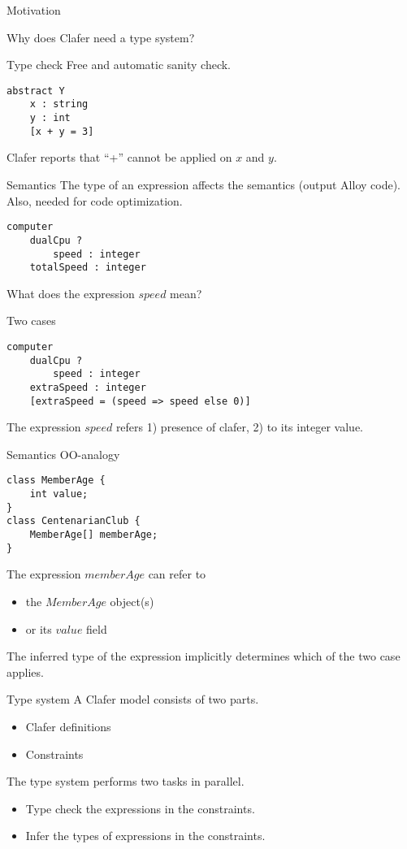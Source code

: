 \documentclass[table,15pt,t]{beamer}
\newcommand{\vmiddle}[1]{
  \vspace{\stretch{1}}
  #1
  \vspace{\stretch{1}}
}
\begin{document}
\begin{frame}{Motivation}
\vmiddle{Why does Clafer need a type system?}
\end{frame}

\begin{frame}[fragile,c]{Type check}
Free and automatic sanity check.
\vfill \begin{lstlisting}
abstract Y
    x : string
    y : int
    [x + y = 3]
\end{lstlisting}
Clafer reports that ``+'' cannot be applied on $x$ and $y$.
\end{frame}

\begin{frame}[fragile,c]{Semantics}
The type of an expression affects the semantics (output Alloy code). Also, needed for code optimization.
\vfill \begin{lstlisting}
computer
    dualCpu ?
        speed : integer
    totalSpeed : integer
\end{lstlisting}
What does the expression $speed$ mean?
\end{frame}

\begin{frame}[fragile,c]{Two cases}
\begin{lstlisting}
computer
    dualCpu ?
        speed : integer
    extraSpeed : integer
    [extraSpeed = (speed => speed else 0)]
\end{lstlisting}
The expression $speed$ refers 1) presence of clafer, 2) to its integer value.
\end{frame}

\begin{frame}[fragile,c]{Semantics OO-analogy}
\lstset{language=Java}
\begin{lstlisting}
class MemberAge {
    int value;
}
class CentenarianClub {
    MemberAge[] memberAge;
}
\end{lstlisting}
The expression $memberAge$ can refer to
\begin{itemize}
\item the $MemberAge$ object(s)
\item or its $value$ field
\end{itemize}

The inferred type of the expression implicitly determines which of the two case applies.
\end{frame}

\begin{frame}[fragile,c]{Type system}
A Clafer model consists of two parts.
\begin{itemize}
\item Clafer definitions
\item Constraints
\end{itemize}

\vfill The type system performs two tasks in parallel.
\begin{itemize}
\item Type check the expressions in the constraints.
\item Infer the types of expressions in the constraints.
\end{itemize}
\end{frame}
\end{document}

